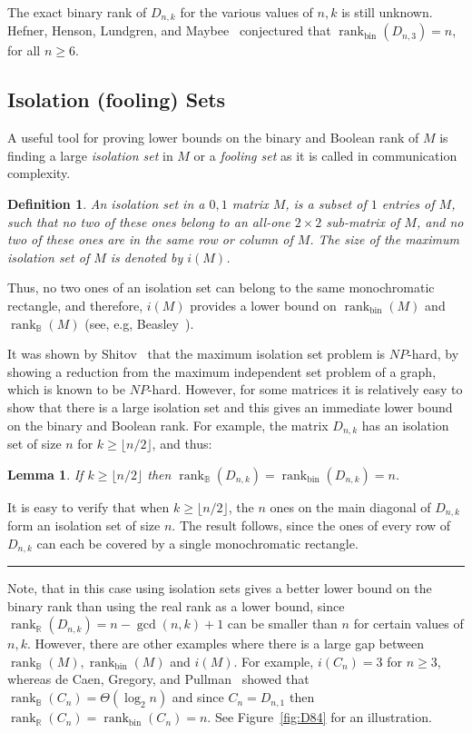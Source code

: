 \documentclass[11pt]{article}
\newtheorem{definition}[theorem]{Definition}
\newtheorem{lemma}[theorem]{Lemma}
\newcommand{\qedsymb}{\hfill{\rule{2mm}{2mm}}}
\renewenvironment{proof}[1][]{\begin{trivlist}
\item[\hspace{\labelsep}{\bf\noindent Proof#1:\/}] }{\qedsymb\end{trivlist}}
\newcommand{\rank}{\mathop{\mathrm{rank}}}
\newcommand{\Rbool}{{\rank}_\mathbb{B}}
\newcommand{\Rbin}{{\rank}_{\mathrm{bin}}}
\newcommand{\Rreal}{{\rank}_\mathbb{R}}
\begin{document}
The exact binary rank of $D_{n,k}$ for the various values of $n,k$ is still unknown.
Hefner,  Henson,  Lundgren, and  Maybee~\cite{HefnerHLM90} conjectured that $\Rbin(D_{n,3})=n$, for all $n \geq 6$.


\subsection{Isolation (fooling) Sets}
\label{subsec-isolation}
A useful tool for proving lower bounds on the binary and Boolean rank of $M$ is finding a large {\em isolation set} in $M$
or a {\em fooling set} as it is called in communication complexity.

\begin{definition}
An {\em isolation set} in a $0,1$ matrix $M$,  is  a subset of $1$ entries of $M$, such that no two of these ones belong to an all-one $2\times 2$ sub-matrix of $M$,
and no two of these ones are in the same row or column of $M$. The size of the maximum isolation set of $M$ is denoted by $i(M)$.
\end{definition}

Thus, no two ones of an isolation set can belong to the same monochromatic rectangle,
and therefore, $i(M)$ provides a lower bound on $\Rbin(M)$ and $\Rbool(M)$ (see, e.g, Beasley~\cite{BEASLEY20123469}).

It was shown by Shitov~\cite{SHITOV20132500} that the maximum isolation set problem is $NP$-hard, by showing a reduction from the maximum independent set problem of a graph,
which is known to be $NP$-hard.
However, for some matrices it is relatively easy to show that there is a large isolation set and this gives an immediate lower bound on the binary and Boolean rank.
For example, the matrix $D_{n,k}$ has an isolation set of size $n$ for $k \geq \lfloor n/2 \rfloor$, and thus:

\begin{lemma}
If $k \geq \lfloor n/2 \rfloor $ then $\Rbool(D_{n,k}) = \Rbin(D_{n,k}) = n$.
\end{lemma}
\begin{proof}
It is easy to verify that when $k \geq \lfloor n/2 \rfloor $, the $n$ ones on the main diagonal of $D_{n,k}$ form an isolation set of size $n$.
The result follows, since the ones of every row of $D_{n,k}$ can each be covered  by a single monochromatic  rectangle.
\end{proof}
Note, that in this case using isolation sets gives a better lower bound on the binary rank than using the real rank as a lower bound,
since $\Rreal(D_{n,k}) = n-\gcd(n,k)+1$  can be smaller than $n$ for certain values of $n,k$.
However, there are other examples where there is a large gap between $\Rbool(M), \Rbin(M)$ and $i(M)$.
For example, $i(C_n) = 3$ for $n \geq 3$,
whereas de Caen, Gregory, and Pullman~\cite{Caen2} showed that $\Rbool(C_n) = \Theta(\log_2 n)$ and since $C_n = D_{n,1}$ then $\Rreal(C_n) = \Rbin(C_n)= n$.
See Figure~\ref{fig:D84} for an illustration.
\end{document}
